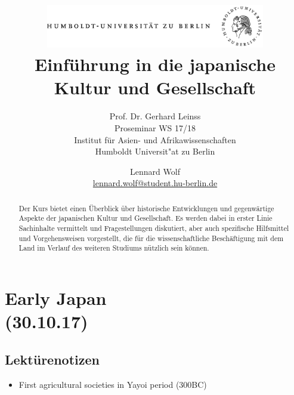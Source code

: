 \documentclass[emulatestandardclasses]{scrartcl}
\date{\vspace{-3ex}}
\begin{document}
\title{
	\includegraphics*[bb=0 0 720 200, width=0.72\textwidth]{ErstesSem/images/hu_logo.png}\\
	\vspace{25pt}
	Einführung in die japanische\\Kultur und Gesellschaft}
\subtitle{\vspace{10pt}
			Prof. Dr. Gerhard Leinss\\
			Proseminar WS 17/18\\
          Institut für Asien- und Afrikawissenschaften\\ 
          Humboldt Universit"at zu Berlin}
\author{Lennard Wolf\\
        \small{\href{mailto:lennard.wolf@student.hu-berlin.de}{lennard.wolf@student.hu-berlin.de}}}
\maketitle
\begin{abstract}
Der Kurs bietet einen Überblick über historische Entwicklungen und gegenwärtige Aspekte der japanischen Kultur und Gesellschaft. Es werden dabei in erster Linie Sachinhalte vermittelt und Fragestellungen diskutiert, aber auch spezifische Hilfsmittel und Vorgehensweisen vorgestellt, die für die wissenschaftliche Beschäftigung mit dem Land im Verlauf des weiteren Studiums nützlich sein können.

\end{abstract}
\newpage

\tableofcontents
\newpage


\section{Early Japan\\(30.10.17)}

\subsection{Lektürenotizen}

\begin{itemize}
  \item First agricultural societies in Yayoi period (300BC)
\end{itemize}
\end{document}
